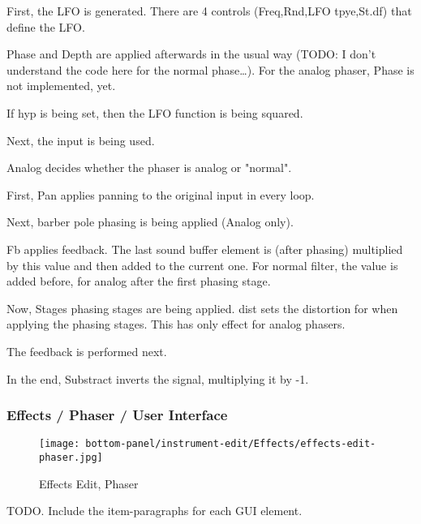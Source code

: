    \begin{enumber}
      \item First, the LFO is generated.
         There are 4 controls (Freq,Rnd,LFO tpye,St.df) that define the LFO.
      \item Phase and Depth are applied afterwards in the usual way (TODO: I
            don’t understand the code here for the normal phase…). For the
            analog phaser, Phase is not implemented, yet.
      \item If hyp is being set, then the LFO function is being squared.
      \item Next, the input is being used.
      \item Analog decides whether the phaser is analog or "normal".
      \item First, Pan applies panning to the original input in every loop.
      \item Next, barber pole phasing is being applied (Analog only).
      \item Fb applies feedback. The last sound buffer element is (after
            phasing) multiplied by this value and then added to the current
            one. For normal filter, the value is added before, for analog
            after the first phasing stage.
      \item Now, Stages phasing stages are being applied. dist sets the
            distortion for when applying the phasing stages. This has only
            effect for analog phasers.
      \item The feedback is performed next.
      \item In the end, Substract inverts the signal, multiplying it by -1.
   \end{enumber}

\subsubsection{Effects / Phaser / User Interface}
\label{subsubsec:effects_edit_phaser_ui}

\begin{figure}[H]
   \centering 
   \texttt{[image: bottom-panel/instrument-edit/Effects/effects-edit-phaser.jpg]}
   \caption{Effects Edit, Phaser}
   \label{fig:effects_edit_phaser}
\end{figure}

   TODO. Include the item-paragraphs for each GUI element.

